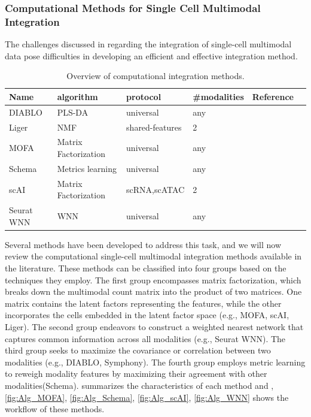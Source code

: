 \subsubsection{Computational Methods for Single Cell Multimodal Integration}
\label{background:sec2:integration}
The challenges discussed in  regarding the integration of single-cell multimodal data pose difficulties in developing an efficient and effective integration method.

\begin{table}[!ht]
	\small
	\centering
	\begin{tabular}{llllll}
		\toprule
		Name & algorithm & protocol & \#modalities  & Reference \\
		\midrule
        DIABLO &  PLS-DA & universal &  any &  \cite{singh2019diablo}\\
        Liger & NMF  &  shared-features&  2 &  \cite{kriebel2021nonnegative} \\
		MOFA     &   Matrix Factorization &  universal &  any &   \cite{argelaguet2020mofa+} \\
		Schema & Metrics learning   & universal  &  any &  \cite{singh2021schema} \\
        scAI & Matrix Factorization  &  scRNA,scATAC & 2 &  \cite{jin2020scai}\\
		Seurat WNN	 &  WNN &  universal &  any &  \cite{hao2021seurat4} \\
		\bottomrule
	\end{tabular}
	\vspace{0.1cm}
	\caption[Overview of computational integration methods]{Overview of computational integration methods.}
	\label{tab:methods_integration_overview}
\end{table}

Several methods have been developed to address this task, and we will now review the computational single-cell multimodal integration methods available in the literature. These methods can be classified into four groups based on the techniques they employ. The first group encompasses matrix factorization, which breaks down the multimodal count matrix into the product of two matrices. One matrix contains the latent factors representing the features, while the other incorporates the cells embedded in the latent factor space (e.g., MOFA, scAI, Liger). The second group endeavors to construct a weighted nearest network that captures common information across all modalities (e.g., Seurat WNN). The third group seeks to maximize the covariance or correlation between two modalities (e.g., DIABLO, Symphony). The fourth group employs metric learning to reweigh modality features by maximizing their agreement with other modalities(Schema).  summarizes the characteristics of each method and , \ref{fig:Alg_MOFA}, \ref{fig:Alg_Schema}, \ref{fig:Alg_scAI}, \ref{fig:Alg_WNN} shows the workflow of these methods.

